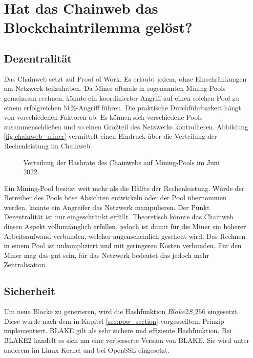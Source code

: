 \section{Hat das Chainweb das Blockchaintrilemma gelöst?}
\subsection{Dezentralität}
Das Chainweb setzt auf Proof of Work. Es erlaubt jedem, ohne Einschränkungen am Netzwerk teilzuhaben. Da Miner oftmals in sogenannten Mining-Pools gemeinsam rechnen, könnte ein koordinierter Angriff auf einen solchen Pool zu einem erfolgreichen 51\%-Angriff führen. Die praktische Durchführbarkeit hängt von verschiedenen Faktoren ab. Es können sich verschiedene Pools zusammenschließen und so einen Großteil des Netzwerks kontrollieren. Abbildung \eqref{fig:chainweb_miner} vermittelt einen Eindruck über die Verteilung der Rechenleistung im Chainweb.

\begin{figure}[h!]
    \centering
    \togglefalse{showpct}
    \caption{Verteilung der Hashrate des Chainwebs auf Mining-Pools im Juni 2022. \cite{KadenaLCC.} \cite{Anedak.}}
    \label{fig:chainweb_miner}
\end{figure}

Ein Mining-Pool besitzt weit mehr als die Hälfte der Rechenleistung. Würde der Betreiber des Pools böse Absichten entwickeln oder der Pool übernommen werden, könnte ein Angreifer das Netzwerk manipulieren. Der Punkt Dezentralität ist nur eingeschränkt erfüllt. Theoretisch könnte das Chainweb diesen Aspekt vollumfänglich erfüllen, jedoch ist damit für die Miner ein höherer Arbeitsaufwand verbunden, welcher augenscheinlich gescheut wird. Das Rechnen in einem Pool ist unkompliziert und mit geringeren Kosten verbunden. Für den Miner mag das gut sein, für das Netzwerk bedeutet das jedoch mehr Zentralisation.

\subsection{Sicherheit}
Um neue Blöcke zu generieren, wird die Hashfunktion $Blake2S\_256$ eingesetzt. Diese wurde nach dem in Kapitel \eqref{sec:pow_section} vorgestelltem Prinzip implementiert. BLAKE gilt als sehr sichere und effiziente Hashfunktion. Bei BLAKE2 handelt es sich um eine verbesserte Version von BLAKE. Sie wird unter anderem im Linux Kernel und bei OpenSSL eingesetzt. \cite{Espitau.2015} \cite{Blake2.2017}

